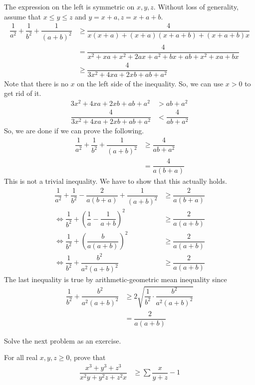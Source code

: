 \documentclass{subfile}
\begin{document}
		\begin{solution}
			The expression on the left is symmetric on $x,y,z$. Without loss of generality, assume that $x\leq y\leq z$ and $y=x+a,z=x+a+b$.
				\begin{align*}
					\dfrac{1}{a^2}+\dfrac{1}{b^2}+\dfrac{1}{(a+b)^2}
						& \geq\dfrac{4}{x(x+a)+(x+a)(x+a+b)+(x+a+b)x}\\
						& = \dfrac{4}{x^2+xa+x^2+2ax+a^2+bx+ab+x^2+xa+bx}\\
						& \geq \dfrac{4}{3x^2+4xa+2xb+ab+a^2}
				\end{align*}
			Note that there is no $x$ on the left side of the inequality. So, we can use $x>0$ to get rid of it.
				\begin{align*}
					3x^2+4xa+2xb+ab+a^2
						& > ab+a^2\\
					\dfrac{4}{3x^2+4xa+2xb+ab+a^2}
						& <\dfrac{4}{ab+a^2}
				\end{align*}
			So, we are done if we can prove the following.
				\begin{align*}
					\dfrac{1}{a^2}+\dfrac{1}{b^2}+\dfrac{1}{(a+b)^2}
						& \geq\dfrac{4}{ab+a^2}\\
						& = \dfrac{4}{a(b+a)}
				\end{align*}
			This is not a trivial inequality. We have to show that this actually holds.
				\begin{align*}
					\dfrac{1}{a^2}+\dfrac{1}{b^2}-\dfrac{2}{a(b+a)}+\dfrac{1}{(a+b)^2}
						& \geq\dfrac{2}{a(b+a)}\\
					\iff\dfrac{1}{b^2}+\left(\dfrac{1}{a}-\dfrac{1}{a+b}\right)^2
						& \geq\dfrac{2}{a(a+b)}\\
					\iff\dfrac{1}{b^2}+\left(\dfrac{b}{a(a+b)}\right)^2
						& \geq\dfrac{2}{a(a+b)}\\
					\iff\dfrac{1}{b^2}+\dfrac{b^2}{a^2(a+b)^2}
						& \geq\dfrac{2}{a(a+b)}
				\end{align*}
			The last inequality is true by arithmetic-geometric mean inequality since
				\begin{align*}
					\dfrac{1}{b^2}+\dfrac{b^2}{a^2(a+b)^2}
						& \geq2\sqrt{\dfrac{1}{b^2}\cdot\dfrac{b^2}{a^2(a+b)^2}}\\
						& = \dfrac{2}{a(a+b)}
				\end{align*}
		\end{solution}
	Solve the next problem as an exercise.
		\begin{problem}
			For all real $x,y,z\geq0$, prove that
				\begin{align*}
					\dfrac{x^3+y^3+z^3}{x^2y+y^2z+z^2x}
						& \geq\sum\dfrac{x}{y+z}-1
				\end{align*}
		\end{problem}
\end{document}
